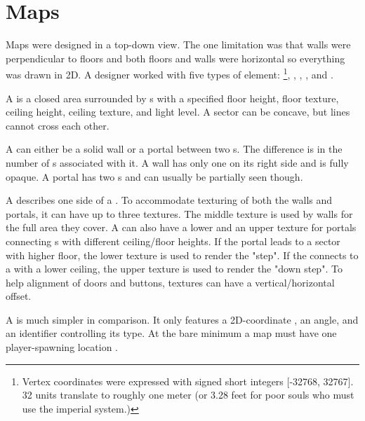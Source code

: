 

\section{Maps}
Maps were designed in a top-down view. The one limitation was that walls were perpendicular to floors and both floors and walls were horizontal so everything was drawn in 2D. A designer worked with five types of element: \footnote{Vertex coordinates were expressed with signed short integers [-32768, 32767]. 32 units translate to roughly one meter (or 3.28 feet for poor souls who must use the imperial system.)}, , , , and .\\
\par
{}

\par
A  is a closed area surrounded by s with a specified floor height, floor texture, ceiling height, ceiling texture, and light level. A sector can be concave, but lines cannot cross each other.\\
\par
A  can either be a solid wall or a portal between two s. The difference is in the number of s associated with it. A wall has only one  on its right side and is fully opaque. A portal has two s and can usually be partially seen though.\\
\par
A  describes one side of a . To accommodate texturing of both the walls and portals, it can have up to three textures. The middle texture is used by walls for the full area they cover. A  can also have a lower and an upper texture for portals connecting s with different ceiling/floor heights. If the portal leads to a sector with higher floor, the lower texture is used to render the "step". If the  connects to a  with a lower ceiling, the upper texture is used to render the "down step". To help alignment of doors and buttons,  textures can have a vertical/horizontal offset. \\
\par
A  is much simpler in comparison. It only features a 2D-coordinate , an angle, and an identifier controlling its type. At the bare minimum a map must have one player-spawning location .\\

